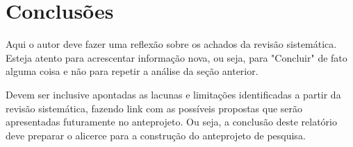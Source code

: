 \documentclass[12pt]{article}
\begin{document}
\section{Conclusões}

Aqui o autor deve fazer uma reflexão sobre os achados da revisão sistemática. Esteja atento para acrescentar informação nova, ou seja, para "Concluir" de fato alguma coisa e não para repetir a análise da seção anterior. 

Devem ser inclusive apontadas as lacunas e limitações identificadas a partir da revisão sistemática, fazendo link com as possíveis propostas que serão apresentadas futuramente no anteprojeto. Ou seja, a conclusão deste relatório deve preparar o alicerce para a construção do anteprojeto de pesquisa. 





\end{document}
